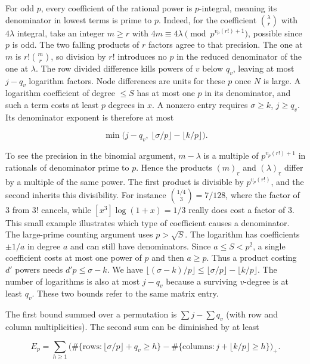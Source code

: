 \documentclass[11pt,a4paper]{article}
\begin{document}
For odd \(p\), every coefficient of the rational power is \(p\)-integral, meaning its denominator in lowest terms is prime to \(p\). Indeed, for the coefficient \(\binom{\lambda}{r}\) with \(4\lambda\) integral, take an integer \(m\ge r\) with \(4m\equiv4\lambda\pmod {p^{v_p(r!)+1}}\), possible since \(p\) is odd. The two falling products of \(r\) factors agree to that precision. The one at \(m\) is \(r!\binom mr\), so division by \(r!\) introduces no \(p\) in the reduced denominator of the one at \(\lambda\). The row divided difference kills powers of \(v\) below \(q_v\), leaving at most \(j-q_v\) logarithm factors. Node differences are units for these \(p\) once \(N\) is large. A logarithm coefficient of degree \(\le S\) has at most one \(p\) in its denominator, and such a term costs at least \(p\) degrees in \(x\). A nonzero entry requires \(\sigma\ge k\), \(j\ge q_v\). Its denominator exponent is therefore at most

\[
 \min\big(j-q_v,\ \lfloor\sigma/p\rfloor-\lfloor k/p\rfloor\big).
\]

To see the precision in the binomial argument, \(m-\lambda\) is a multiple of \(p^{v_p(r!)+1}\) in rationals of denominator prime to \(p\). Hence the products \((m)_{\underline r}\) and \((\lambda)_{\underline r}\) differ by a multiple of the same power. The first product is divisible by \(p^{v_p(r!)}\), and the second inherits this divisibility. For instance \(\binom{1/4}{3}=7/128\), where the factor of \(3\) from \(3!\) cancels, while \([x^3]\log(1+x)=1/3\) really does cost a factor of \(3\). This small example illustrates which type of coefficient causes a denominator. The large-prime counting argument uses \(p>\sqrt S\). The logarithm has coefficients \(\pm1/a\) in degree \(a\) and can still have denominators. Since \(a\le S<p^2\), a single coefficient costs at most one power of \(p\) and then \(a\ge p\). Thus a product costing \(d'\) powers needs \(d'p\le\sigma-k\). We have \(\lfloor(\sigma-k)/p\rfloor\le\lfloor\sigma/p\rfloor-\lfloor k/p\rfloor\). The number of logarithms is also at most \(j-q_v\) because a surviving \(v\)-degree is at least \(q_v\). These two bounds refer to the same matrix entry.

The first bound summed over a permutation is \(\sum j-\sum q_v\) (with row and column multiplicities). The second sum can be diminished by at least

\[
 E_p=\sum_{h\ge1}
 \big(\#\{\text{rows}:\lfloor\sigma/p\rfloor+q_v\ge h\}
       -\#\{\text{columns}: j+\lfloor k/p\rfloor\ge h\}\big)_+ .          \tag{11}\label{eq:11}
\]
\end{document}
